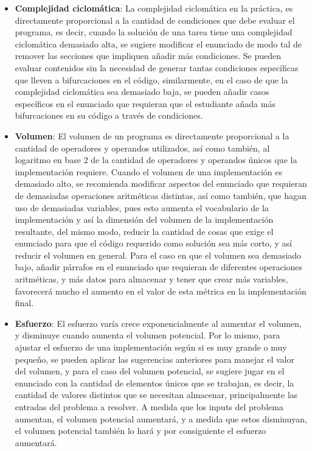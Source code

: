 \documentclass[letterpaper,12pt]{article}
\begin{document}
\begin{itemize}
  \item \textbf{Complejidad ciclomática}: La complejidad ciclomática en la práctica, es directamente proporcional a la cantidad de condiciones que debe evaluar el programa, es decir, cuando la solución de una tarea tiene una complejidad ciclomática demasiado alta, se sugiere modificar el enunciado de modo tal de remover las secciones que impliquen añadir más condiciones. Se pueden evaluar contenidos sin la necesidad de generar tantas condiciones específicas que lleven a bifurcaciones en el código, similarmente, en el caso de que la complejidad ciclomática sea demasiado baja, se pueden añadir casos específicos en el enunciado que requieran que el estudiante añada más bifurcaciones en su código a través de condiciones.
  \item \textbf{Volumen}: El volumen de un programa es directamente proporcional a la cantidad de operadores y operandos utilizados, así como también, al logaritmo en base 2 de la cantidad de operadores y operandos únicos que la implementación requiere. Cuando el volumen de una implementación es demasiado alto, se recomienda modificar aspectos del enunciado que requieran de demasiadas operaciones aritméticas distintas, así como también, que hagan uso de demasiadas variables, pues esto aumenta el vocabulario de la implementación y así la dimensión del volumen de la implementación resultante, del mismo modo, reducir la cantidad de cosas que exige el enunciado para que el código requerido como solución sea más corto, y así reducir el volumen en general. Para el caso en que el volumen sea demasiado bajo, añadir párrafos en el enunciado que requieran de diferentes operaciones aritméticas, y más datos para almacenar y tener que crear más variables, favorecerá mucho el aumento en el valor de esta métrica en la implementación final.
  \item \textbf{Esfuerzo}: El esfuerzo varía crece exponencialmente al aumentar el volumen, y disminuye cuando aumenta el volumen potencial. Por lo mismo, para ajustar el esfuerzo de una implementación según si es muy grande o muy pequeño, se pueden aplicar las sugerencias anteriores para manejar el valor del volumen, y para el caso del volumen potencial, se sugiere jugar en el enunciado con la cantidad de elementos únicos que se trabajan, es decir, la cantidad de valores distintos que se necesitan almacenar, principalmente las entradas del problema a resolver. A medida que los inputs del problema aumentan, el volumen potencial aumentará, y a medida que estos disminuyan, el volumen potencial también lo hará y por consiguiente el esfuerzo aumentará.

\end{itemize}
\end{document}
